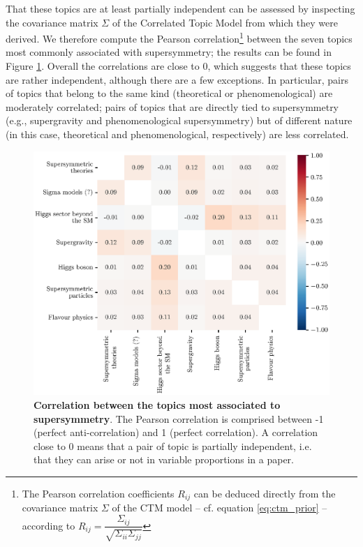 \documentclass[smallextended]{svjour3}
\begin{document}
That these topics are at least partially independent can be assessed by inspecting the covariance matrix $\Sigma$ of the Correlated Topic Model from which they were derived. We therefore compute the Pearson correlation\footnote{The Pearson correlation coefficients $R_{ij}$ can be deduced directly from the covariance matrix $\Sigma$ of the CTM model -- cf. equation \eqref{eq:ctm_prior} -- according to $R_{ij} = \dfrac{\Sigma_{ij}}{\sqrt{\Sigma_{ii}\Sigma_{jj}}}$} between the seven topics most commonly associated with supersymmetry; the results can be found in Figure \ref{fig:susy_correlations}. Overall the correlations are close to 0, which suggests that these topics are rather independent, although there are a few exceptions. In particular, pairs of topics that belong to the same kind (theoretical or phenomenological) are moderately correlated; pairs of topics that are directly tied to supersymmetry (e.g., supergravity and phenomenological supersymmetry) but of different nature (in this case, theoretical and phenomenological, respectively) are less correlated.

\begin{figure}
    \centering
    \hspace*{-2em}\includegraphics{Fig4.eps}
    \caption{\textbf{Correlation between the topics most associated to supersymmetry}. The Pearson correlation is comprised between -1 (perfect anti-correlation) and 1 (perfect correlation). A correlation close to 0 means that a pair of topic is partially independent, i.e. that they can arise or not in variable proportions in a paper.}
    \label{fig:susy_correlations}
\end{figure}
\end{document}
